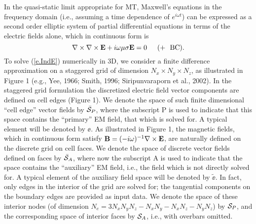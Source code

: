 In the quasi-static limit appropriate for MT,
Maxwell's equations in the frequency domain (i.e., assuming
a time dependence of $e^{i\omega t}$) can be
expressed as a second order elliptic system of
partial differential equations in terms of the electric fields alone,
which in continuous form is
\begin{equation}
\label{e.IndE}
\nabla \times \nabla \times  {\bf E} + i \omega \mu \sigma {\bf E} = 0
\,\,\,\,\,\,\,\,\, ( + \,\,\,\, {\rm BC}) .
\end{equation}
To solve (\ref{e.IndE}) numerically in 3D, we consider a
finite difference approximation on a staggered grid
of dimension $N_x \times N_y \times N_z$, as
illustrated in Figure 1
(e.g., Yee, 1966; Smith, 1996; Siripunvaraporn et al., 2002).
In the staggered grid formulation
the discretized electric field vector components
are defined on cell edges (Figure 1).
We denote the space of such finite dimensional
``cell edge'' vector fields
by $\bar{\cal S}_P$, where the subscript P
is used to indicate that this space contains the ``primary''
EM field, that which is solved for.  A typical element will be
denoted by $\ee$.
As illustrated in Figure 1, the magnetic fields, which
in continuous form
satisfy $ {\bf B} = (-i \omega)^{-1} \nabla \times {\bf E}$,
are naturally defined on the discrete grid on
cell faces.  We denote the
space of discrete vector fields defined on faces 
by $\bar {\cal S}_A$, where now the subscript A is
used to indicate that the space contains the
``auxiliary'' EM field, i.e., the field which is
not directly solved for.  A typical element of the auxiliary field
space will be denoted by $\tilde \ee$.  
In fact, only edges in the interior of the grid 
are solved for; the tangential components on
the boundary edges are provided as input data.
We denote the space of these interior nodes
(of dimension $N_e = 3N_x N_y N_z-N_x N_y - N_x N_z - N_y N_z$)
by ${\cal S}_P$, and the corresponding space of interior faces
by ${\cal S}_A$, i.e., with overbars omitted.

